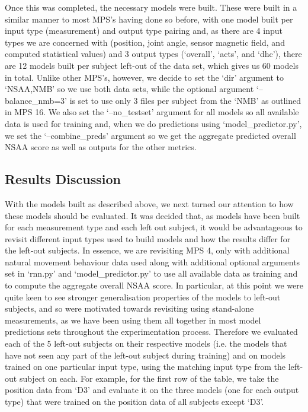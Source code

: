 \documentclass[12pt,twoside]{report}
\begin{document}
\quad Once this was completed, the necessary models were built. These were built in a similar manner to most MPS’s having done so before, with one model built per input type (measurement) and output type pairing and, as there are 4 input types we are concerned with (position, joint angle, sensor magnetic field, and computed statistical values) and 3 output types (‘overall’, ‘acts’, and ‘dhc’), there are 12 models built per subject left-out of the data set, which gives us 60 models in total. Unlike other MPS’s, however, we decide to set the ‘dir’ argument to ‘NSAA,NMB’ so we use both data sets, while the optional argument ‘--balance\_nmb=3’ is set to use only 3 files per subject from the ‘NMB’ as outlined in MPS 16. We also set the ‘--no\_testset’ argument for all models so all available data is used for training and, when we do predictions using ‘model\_predictor.py’, we set the ‘--combine\_preds’ argument so we get the aggregate predicted overall NSAA score as well as outputs for the other metrics.


\subsection{Results Discussion}

\quad With the models built as described above, we next turned our attention to how these models should be evaluated. It was decided that, as models have been built for each measurement type and each left out subject, it would be advantageous to revisit different input types used to build models and how the results differ for the left-out subjects. In essence, we are revisiting MPS 4, only with additional natural movement behaviour data used along with additional optional arguments set in ‘rnn.py’ and ‘model\_predictor.py’ to use all available data as training and to compute the aggregate overall NSAA score. In particular, at this point we were quite keen to see stronger generalisation properties of the models to left-out subjects, and so were motivated towards revisiting using stand-alone measurements, as we have been using them all together in most model predictions sets throughout the experimentation process. Therefore we evaluated each of the 5 left-out subjects on their respective models (i.e. the models that have not seen any part of the left-out subject during training) and on models trained on one particular input type, using the matching input type from the left-out subject on each. For example, for the first row of the table, we take the position data from ‘D3’ and evaluate it on the three models (one for each output type) that were trained on the position data of all subjects except ‘D3’.\\
\end{document}
